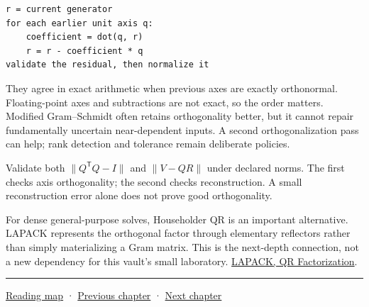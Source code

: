 \begin{verbatim}
r = current generator
for each earlier unit axis q:
    coefficient = dot(q, r)
    r = r - coefficient * q
validate the residual, then normalize it
\end{verbatim}

They agree in exact arithmetic when previous axes are exactly orthonormal. Floating-point axes and subtractions are not exact, so the order matters. Modified Gram--Schmidt often retains orthogonality better, but it cannot repair fundamentally uncertain near-dependent inputs. A second orthogonalization pass can help; rank detection and tolerance remain deliberate policies.

Validate both \(\|Q^\mathsf TQ-I\|\) and \(\|V-QR\|\) under declared norms. The first checks axis orthogonality; the second checks reconstruction. A small reconstruction error alone does not prove good orthogonality.

For dense general-purpose solves, Householder QR is an important alternative. LAPACK represents the orthogonal factor through elementary reflectors rather than simply materializing a Gram matrix. This is the next-depth connection, not a new dependency for this vault's small laboratory. \href{https://www.netlib.org/lapack/lug/node40.html}{LAPACK, QR Factorization}.

\begin{center}\rule{0.5\linewidth}{0.5pt}\end{center}

\href{Chapter\%20Edition/01\%20-\%20Computing\%20Foundations/00\%20-\%20Reading\%20Map}{Reading map} · \hyperref[01-foundations-i-ch016]{Previous chapter} · \hyperref[01-foundations-i-ch018]{Next chapter}
